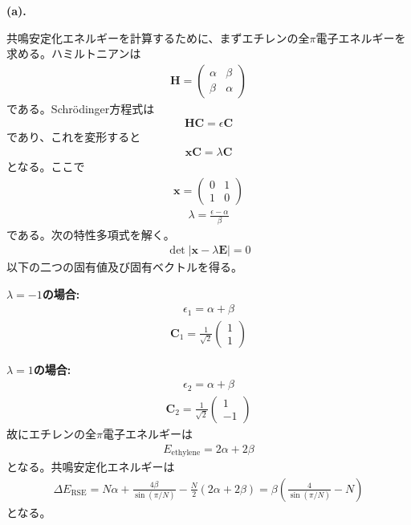 \documentclass{jlreq}
\begin{document}
\noindent
\textbf{(a).} 

共鳴安定化エネルギーを計算するために、まずエチレンの全$\pi$電子エネルギーを求める。ハミルトニアンは
\begin{eqnarray}
    \mathbf{H}=
    \begin{pmatrix}
        \alpha & \beta \\
        \beta & \alpha
    \end{pmatrix}   
\end{eqnarray}  
である。Schr\"odinger方程式は
\begin{eqnarray}
    \mathbf{HC}=\epsilon\mathbf{C}
\end{eqnarray}  
であり、これを変形すると
\begin{eqnarray}
    \mathbf{xC}=\lambda\mathbf{C}
\end{eqnarray}
となる。ここで
\begin{eqnarray}
    \mathbf{x}=
    \begin{pmatrix}
        0 & 1 \\
        1 & 0
    \end{pmatrix}
\end{eqnarray}
\begin{eqnarray}
\lambda=\frac{\epsilon-\alpha}{\beta}
\end{eqnarray}  
である。次の特性多項式を解く。
\begin{eqnarray}
    \det|\mathbf{x}-\lambda\mathbf{E}|=0
\end{eqnarray}  
以下の二つの固有値及び固有ベクトルを得る。

\noindent
\textbf{$\lambda=-1$の場合:}\\
\begin{eqnarray}
    \epsilon_1=\alpha+\beta
\end{eqnarray}  
\begin{eqnarray}
    \mathbf{C}_1=\frac{1}{\sqrt{2}}
    \begin{pmatrix}
        1 \\
        1
    \end{pmatrix}   
\end{eqnarray}

\noindent   
\textbf{$\lambda=1$の場合:}\\ 
\begin{eqnarray}
    \epsilon_2=\alpha+\beta
\end{eqnarray}  
\begin{eqnarray}
    \mathbf{C}_2=\frac{1}{\sqrt{2}}
    \begin{pmatrix}
         1 \\
        -1
    \end{pmatrix}   
\end{eqnarray}
故にエチレンの全$\pi$電子エネルギーは
\begin{eqnarray}
    E_\text{ethylene}=2\alpha+2\beta
\end{eqnarray}  
となる。共鳴安定化エネルギーは
\begin{eqnarray}
    \Delta E_\text{RSE}=N\alpha+\frac{4\beta}{\sin(\pi/N)}-\frac{N}{2}\left(2\alpha+2\beta\right)=\beta\left(\frac{4}{\sin(\pi/N)}-N\right)
\end{eqnarray}
となる。
\end{document}
